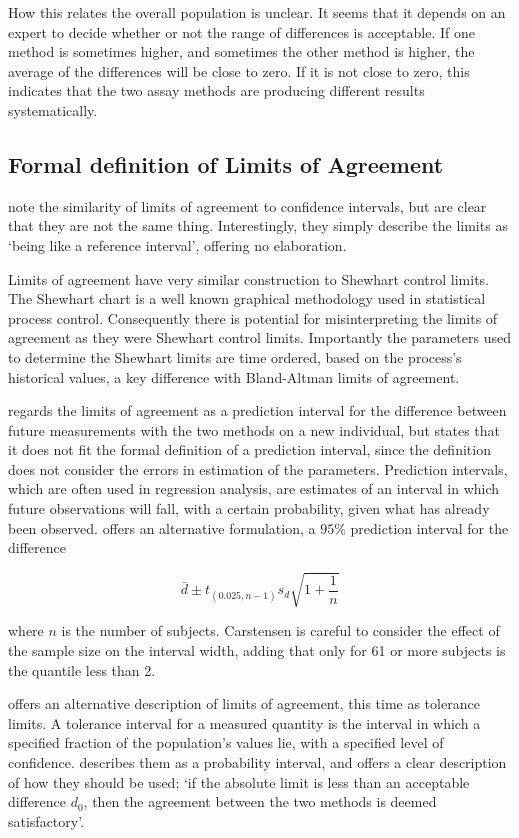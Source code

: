 \documentclass[12pt, a4paper]{report}
\theoremstyle{plain}
\theoremstyle{definition}
\theoremstyle{remark}
\begin{document}
	How this relates the overall population is unclear. It seems that it depends on an expert to decide whether or not the range of
	differences is acceptable. 
	If one method is sometimes higher, and sometimes the other method is higher, the average of the differences will be close to zero.
	If it is not close to zero, this indicates that the two assay methods are producing different results systematically.


\subsection{Formal definition of Limits of Agreement}
\citet{BA99} note the similarity of limits of agreement to confidence intervals, but are clear that they are not the same
thing. Interestingly, they simply describe the limits as `being like a reference interval', offering no elaboration.
	
Limits of agreement have very similar construction to Shewhart control limits. The Shewhart chart is a well known graphical
methodology used in statistical process control. Consequently there is potential for misinterpreting the limits of agreement as
they were Shewhart control limits. Importantly the parameters used to determine the Shewhart limits are time ordered, based on the process's historical values, a key difference with Bland-Altman limits of agreement.
	
\citet{BXC2008} regards the limits of agreement as a prediction interval for the difference between future measurements with the
two methods on a new individual, but states that it does not fit the formal definition of a prediction interval, since the definition does not consider the errors in estimation of the parameters. Prediction intervals, which are often used in regression analysis, are estimates of an interval in which future observations will fall, with a certain probability, given what has
already been observed. \citet{BXC2008} offers an alternative formulation, a $95\%$ prediction interval for the difference

	\[
	\bar{d} \pm t_{(0.025, n-1)}s_{d} \sqrt{1+\frac{1}{n}}
	\]
	
\noindent where $n$ is the number of subjects. Carstensen is careful to consider the effect of the sample size on the interval
width, adding that only for 61 or more subjects is the quantile less than 2.
	
\citet{luiz} offers an alternative description of limits of agreement, this time as tolerance limits. A tolerance interval for
a measured quantity is the interval in which a specified fraction of the population's values lie, with a specified level of
confidence. \citet{Barnhart} describes them as a probability interval, and offers a clear description of how they should be used; `if the absolute limit is less than an acceptable difference $d_{0}$, then the agreement between the two methods is deemed
satisfactory'.
\end{document}
